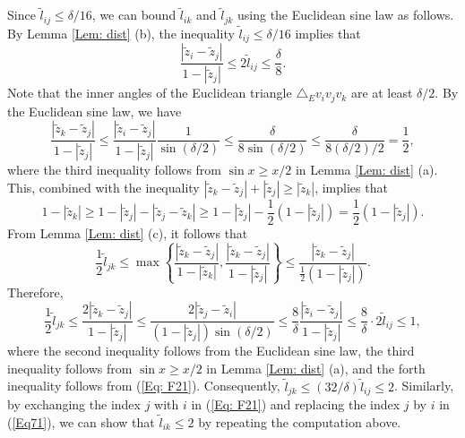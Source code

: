 \documentclass[12pt]{amsart}
\theoremstyle{definition}
\begin{document}
Since $\tilde l_{ij}\leq \delta/16$, we can bound $\tilde l_{ik}$ and $\tilde l_{jk}$ using the Euclidean sine law as follows.
By Lemma \ref{Lem: dist} (b), the inequality $\tilde l_{ij}\leq \delta/16$ implies that
\begin{equation}\label{Eq: F21}
\frac{|\tilde z_i-\tilde z_j|}{1-|\tilde z_j|} 
\leq 2\tilde l_{ij} \leq\frac{\delta}{8}.
\end{equation}
Note that the inner angles of the Euclidean triangle $\triangle_E v_iv_jv_k$ are at least $\delta/2$.
By the Euclidean sine law, we have  
\begin{equation}
\label{Eq71}
\frac{|\tilde z_k-\tilde z_j|}{1-|\tilde z_j|}
\leq \frac{|\tilde z_i-\tilde z_j|}{1-|\tilde z_j|}\frac{1}{\sin(\delta/2)}
\leq \frac{\delta}{8\sin(\delta/2)}
\leq \frac{\delta}{8(\delta/2)/2}
=\frac{1}{2},
\end{equation}
where the third inequality follows from $\sin x\geq x/2$ in Lemma \ref{Lem: dist} (a).
This, combined with the inequality $|\tilde z_k-\tilde z_j|+|\tilde z_j|\geq |\tilde z_k|$, implies that
\begin{equation*}
1-|\tilde z_k|
\geq 1-|\tilde z_j|-|\tilde z_j-\tilde z_k|
\geq 1-|\tilde z_j|-\frac{1}{2}(1-|\tilde z_j|)
=\frac{1}{2}(1-|\tilde z_j|).
\end{equation*}
From Lemma \ref{Lem: dist} (c), it follows that
\begin{equation*}
\frac{1}{2}\tilde l_{jk}
\leq \max \left\{\frac{|\tilde z_k - \tilde z_j|}{1- |\tilde z_k|}, \frac{|\tilde z_k - \tilde z_j|}{1-|\tilde z_j|}\right\}
\leq \frac{|\tilde z_k - \tilde z_j|}{\frac{1}{2}(1-|\tilde z_j|)}.
\end{equation*}
Therefore, 
\begin{equation}
\label{Eq72}
\frac{1}{2}\tilde l_{jk}
\leq\frac{2|\tilde z_k-\tilde z_j|}{1-|\tilde z_j|}
\leq\frac{2|\tilde z_j-\tilde z_i|}{(1-|\tilde z_j|)\sin(\delta/2)}
\leq\frac{8}{\delta}\frac{|\tilde z_i-\tilde z_j|}{1-|\tilde z_j|}
\leq\frac{8}{\delta}\cdot 2\tilde l_{ij}
\leq 1,
\end{equation}
where the second inequality follows from the Euclidean sine law, the third inequality follows from $\sin x\geq x/2$ in Lemma \ref{Lem: dist} (a), and the forth inequality follows from (\ref{Eq: F21}).
Consequently, $\tilde l_{jk}\leq (32/\delta)\tilde l_{ij}\leq 2$. 
Similarly, by exchanging the index $j$ with $i$ in (\ref{Eq: F21}) and replacing the index $j$ by $i$ in (\ref{Eq71}), we can show that $\tilde l_{ik}\leq 2$ by repeating the computation above.
\end{document}
